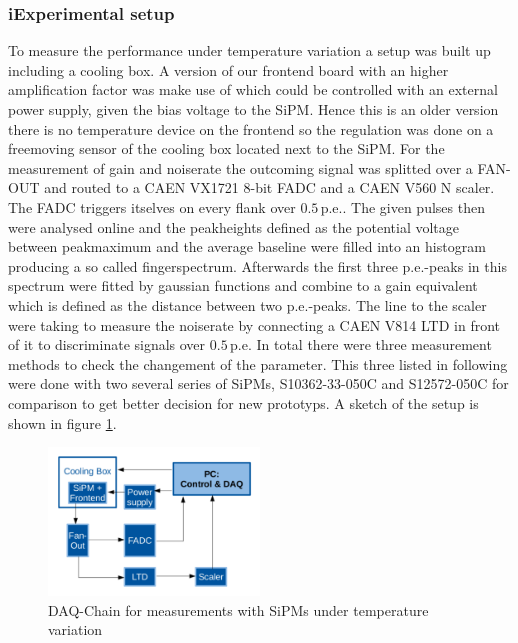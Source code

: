 \subsubsection{iExperimental setup}
To measure the performance under temperature variation a setup was built up including a cooling box.
A version of our frontend board with an higher amplification factor was make use of which could be controlled with an external power supply, given the bias voltage to the SiPM. Hence this is an older version there is no temperature device on the frontend so the regulation was done on a freemoving sensor of the cooling box located next to the SiPM. For the measurement of gain and noiserate the outcoming signal was splitted over a FAN-OUT and routed to a CAEN VX1721 8-bit FADC and a CAEN V560 N scaler.
The FADC triggers itselves on every flank over $0.5\,\mathrm{p.e.}$. The given pulses then were analysed online and the peakheights defined as the potential voltage between peakmaximum and the average baseline were filled into an histogram producing a so called fingerspectrum.
Afterwards the first three p.e.-peaks in this spectrum were fitted by gaussian functions and combine to a gain equivalent which is defined as the distance between two p.e.-peaks.
The line to the scaler were taking to measure the noiserate by connecting a CAEN V814 LTD in front of it to discriminate signals over $0.5\,\mathrm{p.e}$.
In total there were three measurement methods to check the changement of the parameter. This three listed in following were done with two several series of SiPMs, S10362-33-050C and S12572-050C for comparison to get better decision for new prototyps.
A sketch of the setup is shown in figure \ref{NoRa_DAQ}. 
\begin{figure}[h]
	\centering
	\includegraphics[width = 0.5\textwidth]{Figures/radermacher/NoRa_DAQ_en.pdf}
	\caption{DAQ-Chain for measurements with SiPMs under temperature variation}
	\label{NoRa_DAQ}
\end{figure}
